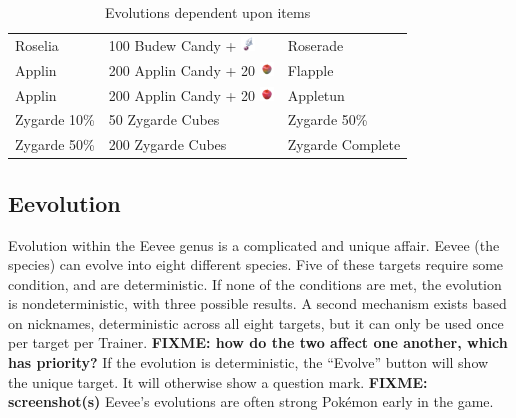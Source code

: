 \begin{table}[ht]
\begin{center}
\begin{tabular}{lll}
    Roselia & 100 Budew Candy + \includegraphics[width=1em,height=1em]{images/sinnohstone.png} & Roserade	\\
    Applin & 200 Applin Candy + 20 \includegraphics[width=1em,height=1em]{images/tartapple.png} & Flapple \\
    Applin & 200 Applin Candy + 20 \includegraphics[width=1em,height=1em]{images/sweetapple.png} & Appletun \\
    Zygarde 10\% & 50 Zygarde Cubes & Zygarde 50\% \\
    Zygarde 50\% & 200 Zygarde Cubes & Zygarde Complete \\
  \end{tabular}
\end{center}
\caption{Evolutions dependent upon items}
\label{table:itemevolutions}
\end{table}

\subsection{Eevolution}
\begin{figure}
\end{figure}
Evolution within the Eevee genus is a complicated and unique affair.
Eevee (the species) can evolve into eight different species.
Five of these targets require some condition, and are deterministic.
If none of the conditions are met, the evolution is nondeterministic,
  with three possible results.
A second mechanism exists based on nicknames, deterministic across all eight targets,
  but it can only be used once per target per Trainer.
\textbf{FIXME: how do the two affect one another, which has priority?}
If the evolution is deterministic, the ``Evolve'' button will show the
  unique target.
It will otherwise show a question mark.
\textbf{FIXME: screenshot(s)}
Eevee's evolutions are often strong Pokémon early in the game.

